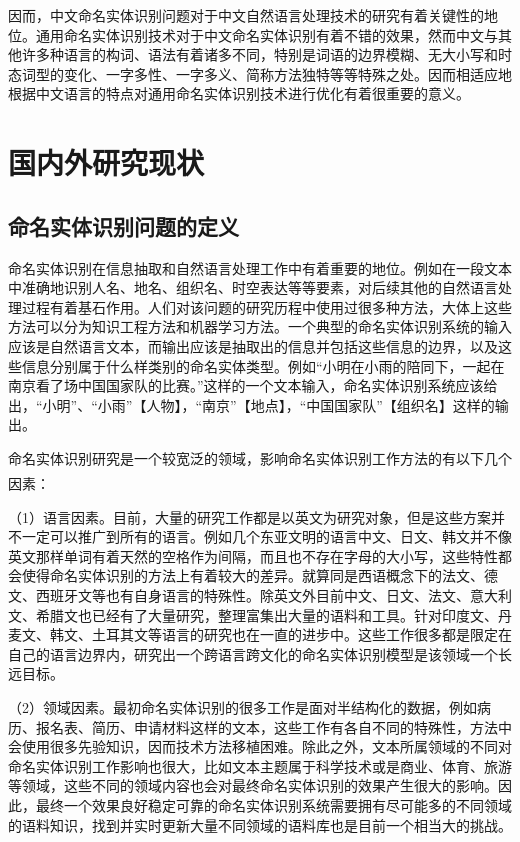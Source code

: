 \documentclass[winfonts,master,oneside,nobackinfo]{njuthesis}
\newcommand{\upcite}[1]{\textsuperscript{\textsuperscript{\cite{#1}}}}
\begin{document}
因而，中文命名实体识别问题对于中文自然语言处理技术的研究有着关键性的地位。通用命名实体识别技术对于中文命名实体识别有着不错的效果，然而中文与其他许多种语言的构词、语法有着诸多不同，特别是词语的边界模糊、无大小写和时态词型的变化、一字多性、一字多义、简称方法独特等等特殊之处。因而相适应地根据中文语言的特点对通用命名实体识别技术进行优化有着很重要的意义。



\section{国内外研究现状}
\subsection{命名实体识别问题的定义}
命名实体识别在信息抽取和自然语言处理工作中有着重要的地位。例如在一段文本中准确地识别人名、地名、组织名、时空表达等等要素，对后续其他的自然语言处理过程有着基石作用。人们对该问题的研究历程中使用过很多种方法，大体上这些方法可以分为知识工程方法和机器学习方法。一个典型的命名实体识别系统的输入应该是自然语言文本，而输出应该是抽取出的信息并包括这些信息的边界，以及这些信息分别属于什么样类别的命名实体类型。例如“小明在小雨的陪同下，一起在南京看了场中国国家队的比赛。”这样的一个文本输入，命名实体识别系统应该给出，“小明”、“小雨”【人物】，“南京”【地点】，“中国国家队”【组织名】这样的输出。

命名实体识别研究是一个较宽泛的领域，影响命名实体识别工作方法的有以下几个因素\upcite{ASTUDY}：

（1）语言因素。目前，大量的研究工作都是以英文为研究对象，但是这些方案并不一定可以推广到所有的语言。例如几个东亚文明的语言中文、日文、韩文并不像英文那样单词有着天然的空格作为间隔，而且也不存在字母的大小写，这些特性都会使得命名实体识别的方法上有着较大的差异。就算同是西语概念下的法文、德文、西班牙文等也有自身语言的特殊性。除英文外目前中文、日文、法文、意大利文、希腊文也已经有了大量研究，整理富集出大量的语料和工具。针对印度文、丹麦文、韩文、土耳其文等语言的研究也在一直的进步中。这些工作很多都是限定在自己的语言边界内，研究出一个跨语言跨文化的命名实体识别模型是该领域一个长远目标。

（2）领域因素。最初命名实体识别的很多工作是面对半结构化的数据，例如病历、报名表、简历、申请材料这样的文本，这些工作有各自不同的特殊性，方法中会使用很多先验知识，因而技术方法移植困难。除此之外，文本所属领域的不同对命名实体识别工作影响也很大，比如文本主题属于科学技术或是商业、体育、旅游等领域，这些不同的领域内容也会对最终命名实体识别的效果产生很大的影响。因此，最终一个效果良好稳定可靠的命名实体识别系统需要拥有尽可能多的不同领域的语料知识，找到并实时更新大量不同领域的语料库也是目前一个相当大的挑战。
\end{document}
